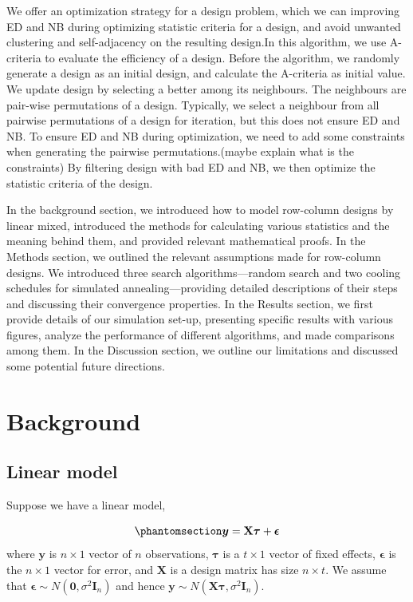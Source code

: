 \documentclass[
  a4paper,
  oneside,
  openany,
  12pt,
  onecolumn]{book}
\theoremstyle{plain}
\theoremstyle{definition}
\theoremstyle{remark}
\begin{document}
We offer an optimization strategy for a design problem, which we can
improving ED and NB during optimizing statistic criteria for a design,
and avoid unwanted clustering and self-adjacency on the resulting
design.In this algorithm, we use A-criteria to evaluate the efficiency
of a design. Before the algorithm, we randomly generate a design as an
initial design, and calculate the A-criteria as initial value. We update
design by selecting a better among its neighbours. The neighbours are
pair-wise permutations of a design. Typically, we select a neighbour
from all pairwise permutations of a design for iteration, but this does
not ensure ED and NB. To ensure ED and NB during optimization, we need
to add some constraints when generating the pairwise permutations.(maybe
explain what is the constraints) By filtering design with bad ED and NB,
we then optimize the statistic criteria of the design.

In the background section, we introduced how to model row-column designs
by linear mixed, introduced the methods for calculating various
statistics and the meaning behind them, and provided relevant
mathematical proofs. In the Methods section, we outlined the relevant
assumptions made for row-column designs. We introduced three search
algorithms---random search and two cooling schedules for simulated
annealing---providing detailed descriptions of their steps and
discussing their convergence properties. In the Results section, we
first provide details of our simulation set-up, presenting specific
results with various figures, analyze the performance of different
algorithms, and made comparisons among them. In the Discussion section,
we outline our limitations and discussed some potential future
directions.


\chapter{Background}\label{sec-bg}

\section{Linear model}\label{linear-model}

Suppose we have a linear model,

\begin{equation}\phantomsection\label{eq-lm}{\boldsymbol{y}=\mathbf{X}\boldsymbol{\tau} + \boldsymbol{\epsilon}}\end{equation}
where \(\boldsymbol{y}\) is \(n\times 1\) vector of \(n\) observations,
\(\boldsymbol{\tau}\) is a \(t\times 1\) vector of fixed effects,
\(\boldsymbol{\epsilon}\) is the \(n\times 1\) vector for error, and
\(\mathbf{X}\) is a design matrix has size \(n\times t\). We assume that
\(\boldsymbol{\epsilon} \sim N(\boldsymbol{0}, \sigma^2\boldsymbol{I}_{n})\)
and hence
\(\boldsymbol{y} \sim N(\mathbf{X}\boldsymbol{\tau}, \sigma^2\mathbf{I}_n)\).
\end{document}
